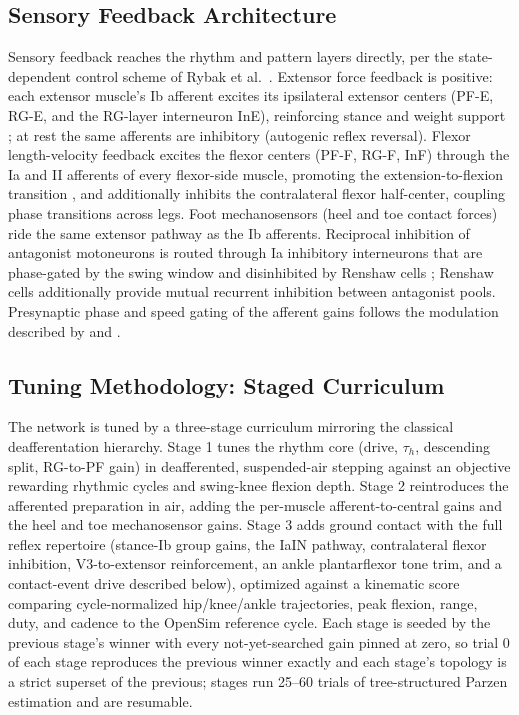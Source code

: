 \subsection{Sensory Feedback Architecture}
\label{sec:spinal-cpg-sensory}

Sensory feedback reaches the rhythm and pattern layers directly, per
the state-dependent control scheme of Rybak et
al.~\citep{rybak2025}. Extensor force feedback is positive: each
extensor muscle's Ib afferent excites its ipsilateral extensor centers
(PF-E, RG-E, and the RG-layer interneuron InE), reinforcing stance and
weight support \citep{gossard1994, pearson2000, dominguez2020}; at
rest the same afferents are inhibitory (autogenic reflex reversal).
Flexor length-velocity feedback excites the flexor centers (PF-F,
RG-F, InF) through the Ia and II afferents of every flexor-side
muscle, promoting the extension-to-flexion transition
\citep{perreault2011, rybak2025}, and additionally inhibits the
contralateral flexor half-center, coupling phase transitions across
legs. Foot mechanosensors (heel and toe contact forces) ride the same
extensor pathway as the Ib afferents. Reciprocal inhibition of
antagonist motoneurons is routed through Ia inhibitory interneurons
that are phase-gated by the swing window and disinhibited by Renshaw
cells \citep{hultborn1971}; Renshaw cells additionally provide mutual
recurrent inhibition between antagonist pools. Presynaptic phase and
speed gating of the afferent gains follows the modulation described by
\citet{pearson1998} and \citet{jankowska2010}.

\subsection{Tuning Methodology: Staged Curriculum}
\label{sec:spinal-cpg-tuning}

The network is tuned by a three-stage curriculum mirroring the
classical deafferentation hierarchy. Stage 1 tunes the rhythm core
(drive, $\tau_h$, descending split, RG-to-PF gain) in deafferented,
suspended-air stepping against an objective rewarding rhythmic cycles
and swing-knee flexion depth. Stage 2 reintroduces the afferented
preparation in air, adding the per-muscle afferent-to-central gains
and the heel and toe mechanosensor gains. Stage 3 adds ground contact
with the full reflex repertoire (stance-Ib group gains, the IaIN
pathway, contralateral flexor inhibition, V3-to-extensor
reinforcement, an ankle plantarflexor tone trim, and a contact-event
drive described below), optimized against a kinematic score comparing
cycle-normalized hip/knee/ankle trajectories, peak flexion, range,
duty, and cadence to the OpenSim reference cycle. Each stage is seeded
by the previous stage's winner with every not-yet-searched gain pinned
at zero, so trial 0 of each stage reproduces the previous winner
exactly and each stage's topology is a strict superset of the
previous; stages run 25--60 trials of tree-structured Parzen
estimation and are resumable.

